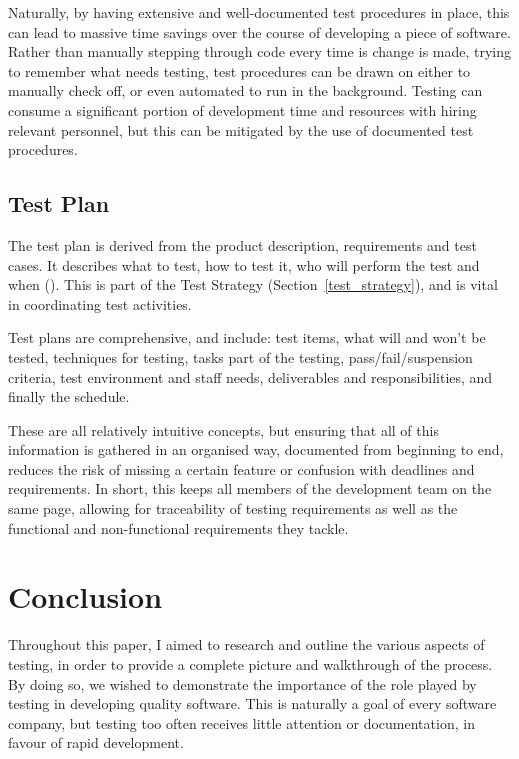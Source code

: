 \documentclass[12pt]{article}
\begin{document}
Naturally, by having extensive and well-documented test procedures in place, this can lead to massive time savings over the course of developing a piece of software. Rather than manually stepping through code every time is change is made, trying to remember what needs testing, test procedures can be drawn on either to manually check off, or even automated to run in the background. Testing can consume a significant portion of development time and resources with hiring relevant personnel, but this can be mitigated by the use of documented test procedures.


\subsection{Test Plan} \label{testplan}

The test plan is derived from the product description, requirements and test cases. It describes what to test, how to test it, who will perform the test and when (). This is part of the Test Strategy (Section~\ref{test_strategy}), and is vital in coordinating test activities.

Test plans are comprehensive, and include: test items, what will and won't be tested, techniques for testing, tasks part of the testing, pass/fail/suspension criteria, test environment and staff needs, deliverables and responsibilities, and finally the schedule. 

These are all relatively intuitive concepts, but ensuring that all of this information is gathered in an organised way, documented from beginning to end, reduces the risk of missing a certain feature or confusion with deadlines and requirements. In short, this keeps all members of the development team on the same page, allowing for traceability of testing requirements as well as the functional and non-functional requirements they tackle.




\section{Conclusion}

Throughout this paper, I aimed to research and outline the various aspects of testing, in order to provide a complete picture and walkthrough of the process. By doing so, we wished to demonstrate the importance of the role played by testing in developing quality software. This is naturally a goal of every software company, but testing too often receives little attention or documentation, in favour of rapid development.
\end{document}
